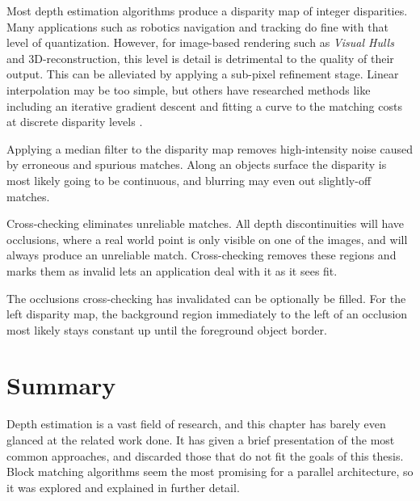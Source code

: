 Most depth estimation algorithms produce a disparity map of integer
disparities. Many applications such as robotics navigation and tracking do
fine with that level of quantization. However, for image-based rendering such
as \textit{Visual Hulls}\cite{torivar} and 3D-reconstruction, this level is
detail is detrimental to the quality of their output. This can be alleviated
by applying a sub-pixel refinement stage. Linear interpolation may be too
simple, but others have researched methods like including an iterative
gradient descent and fitting a curve to the matching costs at discrete
disparity levels \cite{Ryan et al., 1980; Lucas and Kanade, 1981; Tian and
Huhns, 1986;   Matthies et al., 1989; Kanade and okutomi, 1994, taxonomy}.

Applying a median filter to the disparity map removes high-intensity noise
caused by erroneous and spurious matches. Along an objects surface the
disparity is most likely going to be continuous, and blurring may even out
slightly-off matches.

Cross-checking eliminates unreliable matches. All depth discontinuities will
have occlusions, where a real world point is only visible on one of the
images, and will always produce an unreliable match. Cross-checking removes
these regions and marks them as invalid lets an application deal with it as it
sees fit.

The occlusions cross-checking has invalidated can be optionally be filled. For
the left disparity map, the background region immediately to the left of an
occlusion most likely stays constant up until the foreground object border.


\section{Summary}

Depth estimation is a vast field of research, and this chapter has barely even
glanced at the related work done. It has given a brief presentation of the
most common approaches, and discarded those that do not fit the goals of this
thesis. Block matching algorithms seem the most promising for a parallel
architecture, so it was explored and explained in further detail.
